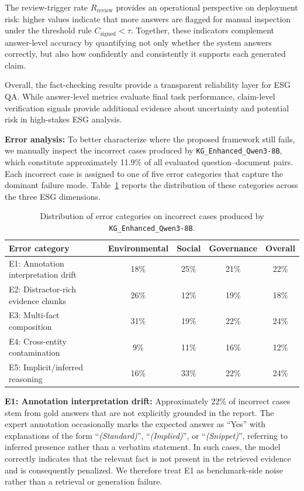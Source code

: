 \documentclass[sn-mathphys, oneside]{sn-jnl}
\begin{document}
The review-trigger rate $R_{\mathrm{review}}$ provides an operational perspective on
deployment risk: higher values indicate that more answers are flagged for manual
inspection under the threshold rule $C_{\mathrm{signed}} < \tau$. Together, these
indicators complement answer-level accuracy by quantifying not only whether the system
answers correctly, but also how confidently and consistently it supports each generated
claim.

Overall, the fact-checking results provide a transparent reliability layer for ESG QA.
While answer-level metrics evaluate final task performance, claim-level verification
signals provide additional evidence about uncertainty and potential risk in
high-stakes ESG analysis.

\textbf{Error analysis: }To better characterize where the proposed framework still fails, we manually
inspect the incorrect cases produced by \texttt{KG\_Enhanced\_Qwen3-8B}, which
constitute approximately 11.9\% of all evaluated question--document pairs. Each
incorrect case is assigned to one of five error categories that capture the
dominant failure mode. Table~\ref{tab:error_distribution} reports the distribution
of these categories across the three ESG dimensions.

\begin{table}[htbp]
    \centering
    \caption{Distribution of error categories on incorrect cases produced by
    \texttt{KG\_Enhanced\_Qwen3-8B}.}
    \label{tab:error_distribution}
    \begin{tabular}{lcccc}
    \toprule
    Error category & Environmental & Social & Governance & Overall \\
    \midrule
    E1: Annotation interpretation drift & 18\% & 25\% & 21\% & 22\% \\
    E2: Distractor-rich evidence chunks & 26\% & 12\% & 19\% & 18\% \\
    E3: Multi-fact composition          & 31\% & 19\% & 22\% & 24\% \\
    E4: Cross-entity contamination      & 9\%  & 11\% & 16\% & 12\% \\
    E5: Implicit/inferred reasoning     & 16\% & 33\% & 22\% & 24\% \\
    \bottomrule
    \end{tabular}
\end{table}

\textbf{E1: Annotation interpretation drift: }
Approximately 22\% of incorrect cases stem from gold answers that are not
explicitly grounded in the report. The expert annotation occasionally marks the
expected answer as ``Yes'' with explanations of the form
``\textit{(Standard)}'', ``\textit{(Implied)}'', or ``\textit{(Snippet)}'',
referring to inferred presence rather than a verbatim statement. In such cases,
the model correctly indicates that the relevant fact is not present in the
retrieved evidence and is consequently penalized. We therefore treat E1 as
benchmark-side noise rather than a retrieval or generation failure.
\end{document}
